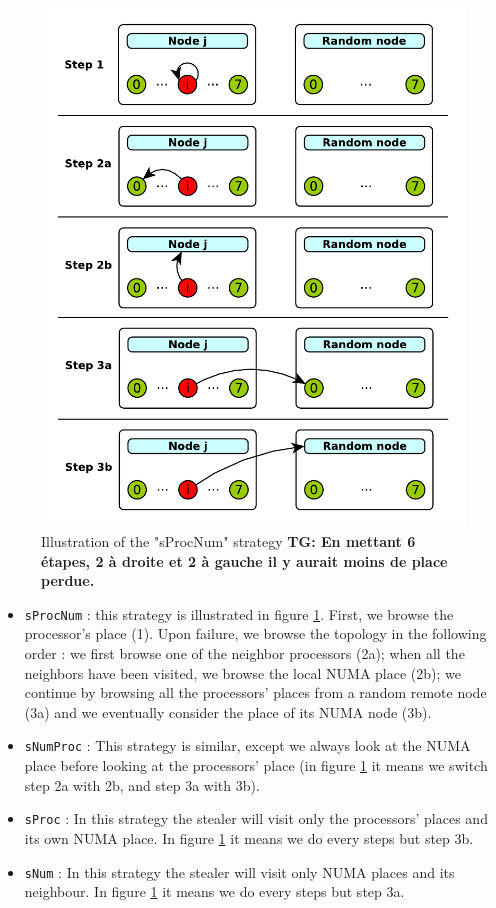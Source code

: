 \documentclass{Styles/llncs}
\newcommand{\TG}[1]{{\color{red}\bfseries TG: #1}}
\begin{document}
\begin{figure}[t]
  \centering
  \includegraphics[scale=0.5]{figures/strategies.pdf}
\caption{Illustration of the "sProcNum" strategy \TG{En mettant 6 étapes, 2 à droite et 2 à gauche il y aurait moins de place perdue.}}
\label{fig:detail-strategy}
\end{figure}
\begin{itemize}
  \item \verb/sProcNum/ : this strategy is illustrated in figure \ref{fig:detail-strategy}.
    First, we browse the processor's place (1). Upon failure, we browse the topology in the following order : we first browse one of the neighbor processors (2a); when all the neighbors have been visited, we browse the local NUMA place (2b); we continue by browsing all the processors' places from a random remote node (3a) and we eventually consider the place of its NUMA node (3b).
  \item \verb/sNumProc/ : This strategy is similar, except we always look at the
    NUMA place before looking at the processors' place (in figure \ref{fig:detail-strategy}
    it means we switch step 2a with 2b, and step 3a with 3b).
  \item \verb/sProc/ : In this strategy the stealer will visit only the
    processors' places and its own NUMA place. In figure \ref{fig:detail-strategy} it means we do
    every steps but step 3b.
  \item \verb/sNum/ : In this strategy the stealer will visit only NUMA places
    and its neighbour. In figure \ref{fig:detail-strategy} it means we do
    every steps but step 3a.
\end{itemize}
\end{document}
